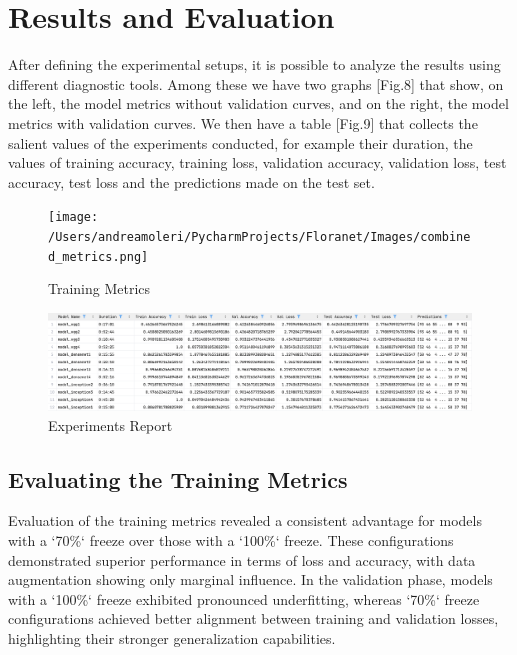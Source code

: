 \section{Results and Evaluation}

After defining the experimental setups, it is possible to analyze the results using different diagnostic tools.
Among these we have two graphs [Fig.8] that show, on the left, the model metrics without validation curves, and on
the right, the model metrics with validation curves. We then have a table [Fig.9] that collects the salient values
of the experiments conducted, for example their duration, the values ​​of training accuracy, training loss,
validation accuracy, validation loss, test accuracy, test loss and the predictions made on the test set.

\begin{figure}[h!]
    \centering
    \texttt{[image: /Users/andreamoleri/PycharmProjects/Floranet/Images/combined\_metrics.png]}
    \caption{Training Metrics}
\end{figure}

\begin{figure}[h!]
    \centering
    \includegraphics[width=\linewidth]{Images/Report}
    \caption{Experiments Report}
\end{figure}

\subsection{Evaluating the Training Metrics}

Evaluation of the training metrics revealed a consistent advantage for models with a `70\%` freeze over those with a
`100\%` freeze. These configurations demonstrated superior performance in terms of loss and accuracy, with data
augmentation showing only marginal influence. In the validation phase, models with a `100\%` freeze exhibited pronounced
underfitting, whereas `70\%` freeze configurations achieved better alignment between training and validation losses,
highlighting their stronger generalization capabilities.

\vspace{0.3cm}

